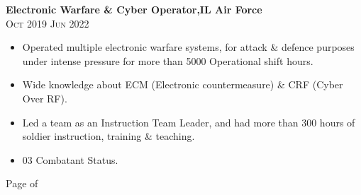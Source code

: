 \documentclass[oneside]{article}
\begin{document}
{\begin{minipage}[t][\dimexpr\textheight-2\fboxrule-2\fboxsep\relax][t]{\dimexpr0.55\textwidth-2\fboxrule-2\fboxsep\relax}
\begin{itemize}
        \end{itemize}

                  \textbf{\large Electronic Warfare \& Cyber Operator,IL Air Force} \\
                    {\scshape{}\selectfont\footnotesize Oct 2019 \textendash{} Jun 2022} 
                    \vspace{0.5\baselineskip} 
        \begin{itemize}
            \setlength{\itemsep}{-3pt}
            \begin{itemize}
                \item Operated multiple electronic warfare systems, for attack \& defence purposes under intense pressure  for more than 5000 Operational shift hours.
                \item Wide knowledge about ECM (Electronic countermeasure) \& CRF (Cyber Over RF).
                \item Led a team as an Instruction Team Leader, and had more than 300 hours of soldier instruction, training \& teaching.
                \item 03 Combatant Status.
            \end{itemize}

        \end{itemize}

               \vfill%
        {\hfill\small{}\selectfont Page \thepage \hspace{0.1em} of \pageref{LastPage}\hfill}
    \end{minipage}
}%
\newpage
\end{document}

